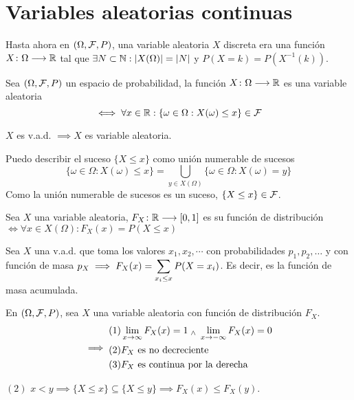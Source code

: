 \section{Variables aleatorias continuas}
Hasta ahora en $(\Omega, \mathcal{F}, P)$, una variable aleatoria $X$ discreta era una función $X \colon \Omega \longrightarrow \mathbb{R}$ tal que $\exists N \subset \mathbb{N} : \left|X(\Omega)\right|=\left|N\right|$ y $P(X=k)=P(X^{-1}(k))$.
\begin{defn}
	Sea $(\Omega, \mathcal{F}, P)$ un espacio de probabilidad, la función $X \colon \Omega \longrightarrow \mathbb{R}$ es una variable aleatoria
	\[\iff \forall x \in \mathbb{R} : \{\omega\in\Omega : X(\omega) \leq x\} \in \mathcal{F}\]
\end{defn}
\begin{prop}
	$X$ es v.a.d. $\implies X$ es variable aleatoria.
	\begin{dem}
		Puedo describir el suceso $\{X\leq x\}$ como unión numerable de sucesos
		\[\{\omega \in\Omega : X(\omega) \leq x\} = \bigcup_{y\in X(\Omega)} \{\omega \in \Omega : X(\omega) = y\}\]
		Como la unión numerable de sucesos es un suceso, $\{X\leq x\} \in \mathcal{F}$.
	\end{dem}
\end{prop}
\begin{defn}
	Sea $X$ una variable aleatoria, $F_X \colon \mathbb{R} \longrightarrow [0,1]$ es su función de distribución $\iff \forall x \in X(\Omega) : \boxed{F_X(x) = P(X\leq x)}$
\end{defn}
Sea $X$ una v.a.d. que toma los valores $x_1, x_2, \cdots$ con probabilidades $p_1, p_2, \dots$ y con función de masa $p_X \displaystyle \implies F_X(x) = \sum_{x_i \leq x} P(X=x_i)$. Es decir, es la función de masa acumulada.
\begin{lem}
	En $(\Omega, \mathcal{F}, P)$, sea $X$ una variable aleatoria con función de distribución $F_X$.
	\[\implies \begin{aligned}
		(1)& \lim_{x\to\infty} F_X(x) = 1 \; _{\wedge} \; \lim_{x\to-\infty} F_X(x) = 0 \\
		(2)& F_X \text{ es no decreciente} \\
		(3)& F_X \text{ es continua por la derecha}
	\end{aligned}\]
	\begin{dem} %
		$(2)$ $x<y \implies \{X\leq x\} \subseteq \{X\leq y\} \implies F_X(x) \leq F_X(y)$.
	\end{dem}
\end{lem}
